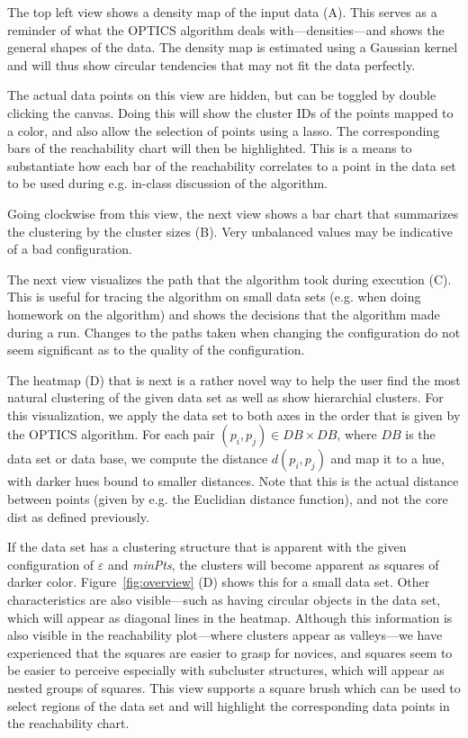 \documentclass{vgtc} %
\begin{document}
The top left view shows a density map of the input data (A). This serves as a reminder
of what the OPTICS algorithm deals with---densities---and shows the general shapes of
the data. The density map is estimated using a Gaussian kernel and will thus show
circular tendencies that may not fit the data perfectly.

The actual data points on this view are hidden, but can be toggled by double clicking
the canvas. Doing this will show the cluster IDs of the points mapped to a color, and
also allow the selection of points using a lasso. The corresponding bars of the reachability
chart will then be highlighted. This is a means to substantiate how each bar of the
reachability correlates to a point in the data set to be used during e.g. in-class
discussion of the algorithm.

Going clockwise from this view, the next view shows a bar chart that summarizes the
clustering by the cluster sizes (B). Very unbalanced values may be indicative of a bad
configuration.

The next view visualizes the path that the algorithm took during execution (C).
This is useful for tracing the algorithm on small data sets (e.g. when doing
homework on the algorithm) and shows the decisions that the algorithm made
during a run. Changes to the paths taken when changing the configuration do not
seem significant as to the quality of the configuration.

The heatmap (D) that is next is a rather novel way to help the user find the most
natural clustering of the given data set as well as show hierarchial clusters.
For this visualization, we apply the data set to both axes in the order that is
given by the OPTICS algorithm. For each pair $(p_i, p_j) \in DB \times
DB$, where $DB$ is the data set or data base, we compute the distance
$d(p_i, p_j)$ and map it to a hue, with darker hues bound to smaller distances.
Note that this is the actual distance between points (given by e.g. the
Euclidian distance function), and not the core dist as defined previously.

If the data set has a clustering structure that is apparent with the given
configuration of $\varepsilon$ and \emph{minPts}, the clusters will become
apparent as squares of darker color. Figure~\ref{fig:overview} (D) shows this for a
small data set. Other characteristics are also visible---such as having
circular objects in the data set, which will appear as diagonal lines in the
heatmap. Although this information is also visible in the reachability
plot---where clusters appear as valleys---we have experienced that the squares
are easier to grasp for novices, and squares seem to be easier to perceive
especially with subcluster structures, which will appear as nested groups of
squares. This view supports a square brush which can be used to select regions
of the data set and will highlight the corresponding data points in the
reachability chart.
\end{document}
